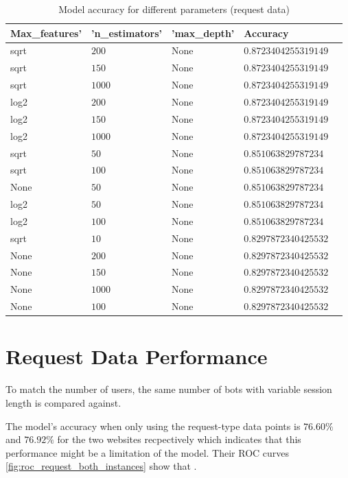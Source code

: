 \documentclass[
    fontsize=12pt,
    headings=small,
    parskip=half,           %
    bibliography=totoc,
    numbers=noenddot,       %
    open=any,               %
    final                   %
]{scrreprt}
\begin{document}
\begin{table}[h!]
\centering
\caption{Model accuracy for different parameters (request data)}
\label{table:request_params}
\begin{tabular}{|l|l|l|l|l}
\hline
Max\_features' & 'n\_estimators' & 'max\_depth' & Accuracy \\
\hline
sqrt & $ 200$  & None & $ 0.8723404255319149$  \\
sqrt & $ 150$  & None & $ 0.8723404255319149$  \\
sqrt & $ 1000$ & None & $ 0.8723404255319149$  \\
log2 & $ 200$  & None & $ 0.8723404255319149$  \\
log2 & $ 150$  & None & $ 0.8723404255319149$  \\
log2 & $ 1000$ & None & $ 0.8723404255319149$  \\
sqrt & $ 50$   & None & $ 0.851063829787234$   \\
sqrt & $ 100$  & None & $ 0.851063829787234$   \\
None   & $ 50$   & None & $ 0.851063829787234$   \\
log2 & $ 50$   & None & $ 0.851063829787234$   \\
log2 & $ 100$  & None & $ 0.851063829787234$   \\
sqrt & $ 10$   & None & $ 0.8297872340425532$  \\
None   & $ 200$  & None & $ 0.8297872340425532$  \\
None   & $ 150$  & None & $ 0.8297872340425532$  \\
None   & $ 1000$ & None & $ 0.8297872340425532$  \\
None   & $ 100$  & None & $ 0.8297872340425532$ \\

\hline
\end{tabular}
\end{table}


\section{Request Data Performance}


To match the number of users, the same number of bots with variable session length is compared against.

The model's accuracy when only using the request-type data points is $76.60\%$ and $76.92\%$ for the two websites recpectively which indicates that this performance might be a limitation of the model. Their ROC curves \ref{fig:roc_request_both_instances} show that .
\end{document}

